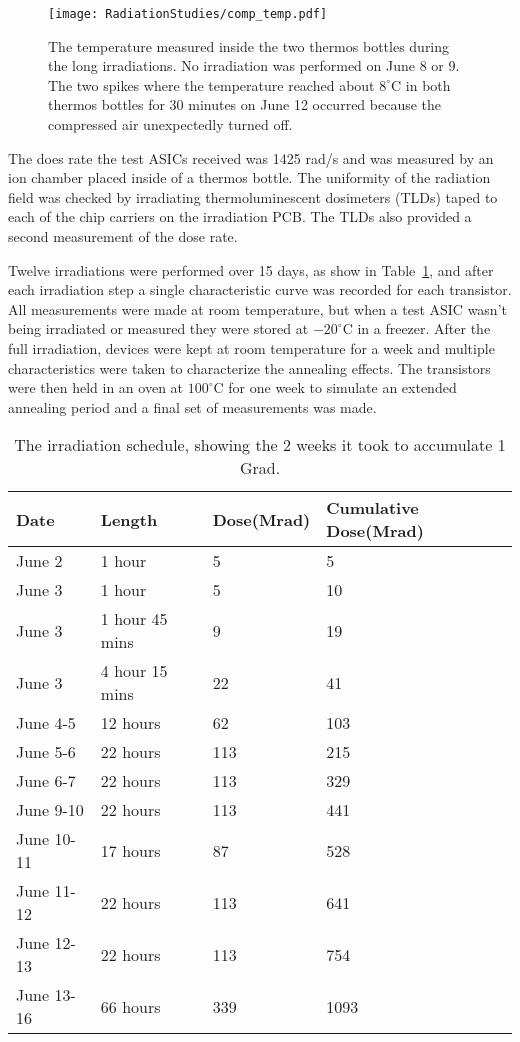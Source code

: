 \begin{figure}[htb!]
\begin{center}
\texttt{[image: RadiationStudies/comp\_temp.pdf]}
\end{center}
\caption{The temperature measured inside the two thermos bottles during the long irradiations. No irradiation was performed on June 8 or 9. The two spikes where the temperature reached about $8^{\circ}\mathrm{C}$ in both thermos bottles for 30 minutes on June 12 occurred because the compressed air unexpectedly turned off.}
\label{fig:Temperature}
\end{figure}

The does rate the test ASICs received was 1425 rad/s and was measured by an ion chamber placed inside of a thermos bottle. The uniformity of the radiation field was checked by irradiating thermoluminescent dosimeters (TLDs) taped to each of the chip carriers on the irradiation PCB. The TLDs also provided a second measurement of the dose rate.

Twelve irradiations were performed over 15 days, as show in Table~\ref{tab:IrradiationSchedule}, and after each irradiation step a single characteristic curve was recorded for each transistor. All measurements were made at room temperature, but when a test ASIC wasn't being irradiated or measured they were stored at $-20^{\circ}\mathrm{C}$ in a freezer. After the full irradiation, devices were kept at room temperature for a week and multiple characteristics were taken to characterize the annealing effects. The transistors were then held in an oven at $100^{\circ}\mathrm{C}$ for one week to simulate an extended annealing period and a final set of measurements was made.

\begin{table}
\begin{center}
\caption{The irradiation schedule, showing the 2 weeks it took to accumulate 1 Grad.}
\begin{tabular}{| p{2cm} | p{2.5cm} | p{2cm} | p{4cm} |}
\hline
Date & Length & Dose(Mrad) & Cumulative Dose(Mrad)\\ \hline
June 2 & 1 hour & 5 & 5\\ \hline
June 3 & 1 hour & 5 & 10 \\ \hline
June 3 & 1 hour 45 mins & 9 & 19 \\ \hline
June 3 & 4 hour 15 mins & 22 & 41 \\ \hline
June 4-5 & 12 hours & 62 & 103 \\ \hline
June 5-6 & 22 hours & 113 & 215 \\ \hline
June 6-7 & 22 hours & 113 & 329 \\ \hline
June 9-10 & 22 hours & 113 & 441 \\ \hline
June 10-11 & 17 hours & 87 & 528 \\ \hline
June 11-12 & 22 hours & 113 & 641 \\ \hline
June 12-13 & 22 hours & 113 & 754 \\ \hline
June 13-16 & 66 hours & 339 & 1093 \\
\hline
\end{tabular}
\label{tab:IrradiationSchedule}
\end{center}
\end{table}


